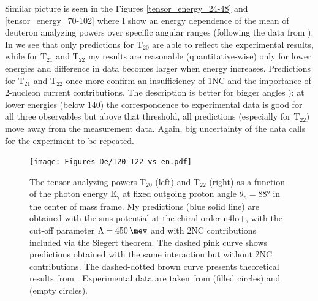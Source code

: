    Similar picture is seen in the Figures \ref{tensor_energy_24-48} and \ref{tensor_energy_70-102}
    where I show an energy dependence of the mean of deuteron analyzing powers over 
    specific angular ranges (following the data from \cite{rachek2007}).
    In  we see that only predictions for $\text{T}_{20}$ are able to reflect the experimental results,
    while for $\text{T}_{21}$ and $\text{T}_{22}$ my results are reasonable (quantitative-wise) 
    only for lower energies and difference in data becomes larger
    when energy increases. Predictions for $\text{T}_{21}$ and $\text{T}_{22}$ once more 
    confirm an insufficiency of 1NC and the importance of
    2-nucleon current contributions.
    The description is better for bigger angles ):
    at lower energies (below \SI{140}{\mev}) the correspondence to
    experimental data is good for all three observables but above that 
    threshold, all predictions (especially for $\text{T}_{22}$)
    move away from the measurement data.
    Again, big uncertainty of the data calls for the experiment to be repeated.
    

    \begin{figure}[h]
        \begin{center}
        \texttt{[image: Figures\_De/T20\_T22\_vs\_en.pdf]}
        \end{center}
        \caption{
        The tensor analyzing powers T$_{20}$ (left) and T$_{22}$ (right) as
        a function of the photon energy E$_\gamma$
        at fixed outgoing proton angle $\theta_p = \ang{88}$ in the center of mass frame.
        My predictions (blue solid line) are obtained with the \gls{sms} potential at the chiral order \gls{n4lo+},
        with the cut-off parameter $\Lambda = \SI{450}{\mev}$ and with 2NC contributions included via the Siegert theorem.
        The dashed pink curve shows predictions obtained with the same interaction but without 2NC contributions.
        The dashed-dotted brown curve presents theoretical results from \cite{Schmitt1989}.
        Experimental data are taken from \cite{rachek2007} (filled circles)
        and \cite{mishev1993} (empty circles).}
        \label{T20_vs_en}
    \end{figure}

